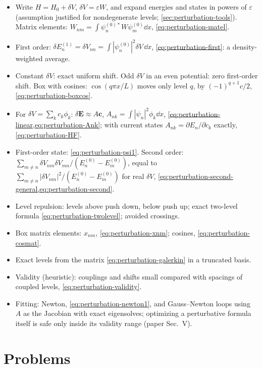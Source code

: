 \begin{itemize}
\item Write $H=H_0+\delta V$, $\delta V=\varepsilon W$, and expand energies and states in powers of $\varepsilon$ (assumption justified for nondegenerate levels; \cref{sec:perturbation-tools}). Matrix elements: $W_{nm}=\int\psi_n^{(0)*}W\psi_m^{(0)}\dd x$, \cref{eq:perturbation-matel}.
\item First order: $\delta E_n^{(1)}=\delta V_{nn}=\int|\psi_n^{(0)}|^2\delta V\,\dd x$, \cref{eq:perturbation-first}: a density-weighted average.
\item Constant $\delta V$: exact uniform shift. Odd $\delta V$ in an even potential: zero first-order shift. Box with cosines: $\cos(q\pi x/L)$ moves only level $q$, by $(-1)^{q+1}c/2$, \cref{eq:perturbation-boxcos}.
\item For $\delta V=\sum_kc_k\phi_k$: $\delta\bm E\approx A\bm c$, $A_{nk}=\int|\psi_n|^2\phi_k\dd x$, \cref{eq:perturbation-linear,eq:perturbation-Ank}; with current states $A_{nk}=\partial E_n/\partial c_k$ exactly, \cref{eq:perturbation-HF}.
\item First-order state: \cref{eq:perturbation-psi1}. Second order: $\sum_{m\ne n}\delta V_{nm}\delta V_{mn}/(E_n^{(0)}-E_m^{(0)})$, equal to $\sum_{m\ne n}|\delta V_{nm}|^2/(E_n^{(0)}-E_m^{(0)})$ for real $\delta V$, \cref{eq:perturbation-second-general,eq:perturbation-second}.
\item Level repulsion: levels above push down, below push up; exact two-level formula \cref{eq:perturbation-twolevel}; avoided crossings.
\item Box matrix elements: $x_{nm}$, \cref{eq:perturbation-xnm}; cosines, \cref{eq:perturbation-cosmat}.
\item Exact levels from the matrix \cref{eq:perturbation-galerkin} in a truncated basis.
\item Validity (heuristic): couplings and shifts small compared with spacings of coupled levels, \cref{eq:perturbation-validity}.
\item Fitting: Newton, \cref{eq:perturbation-newton1}, and Gauss--Newton loops using $A$ as the Jacobian with exact eigensolves; optimizing a perturbative formula itself is safe only inside its validity range (paper Sec.~V).
\end{itemize}

\section{Problems}\label{sec:perturbation-problems}

